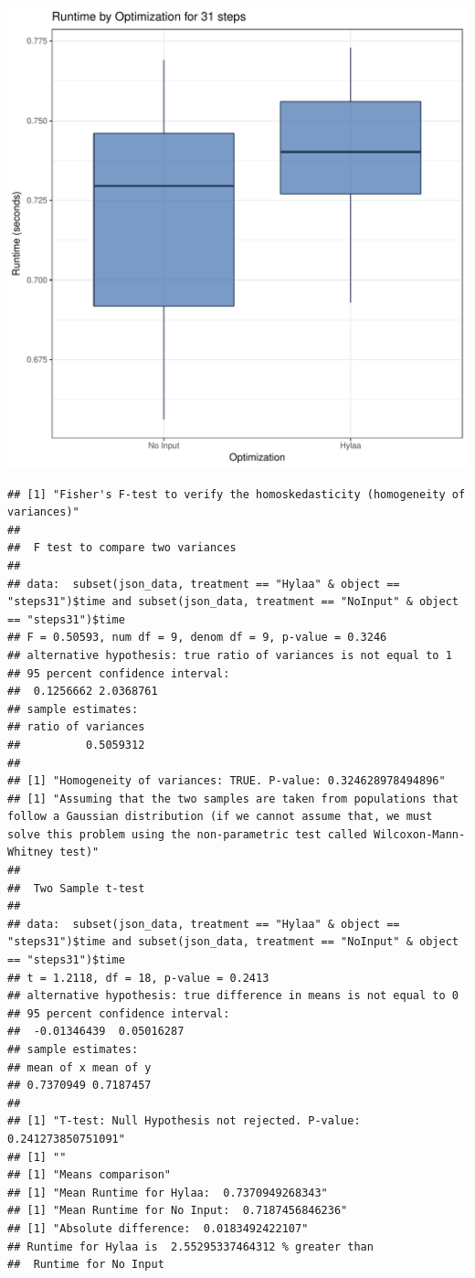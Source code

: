 \documentclass{article}\usepackage[]{graphicx}\usepackage[]{color}
\makeatletter
\def\maxwidth{ %
  \ifdim\Gin@nat@width>\linewidth
    \linewidth
  \else
    \Gin@nat@width
  \fi
}
\newenvironment{kframe}{%
 \def\at@end@of@kframe{}%
 \ifinner\ifhmode%
  \def\at@end@of@kframe{\end{minipage}}%
  \begin{minipage}{\columnwidth}%
 \fi\fi%
 \def\FrameCommand##1{\hskip\@totalleftmargin \hskip-\fboxsep
 \colorbox{shadecolor}{##1}\hskip-\fboxsep
     \hskip-\linewidth \hskip-\@totalleftmargin \hskip\columnwidth}%
 \MakeFramed {\advance\hsize-\width
   \@totalleftmargin\z@ \linewidth\hsize
   \@setminipage}}%
 {\par\unskip\endMakeFramed%
 \at@end@of@kframe}
\newenvironment{knitrout}{}{} %
\makeatother
\begin{document}
\begin{knitrout}
\color{fgcolor}
\includegraphics[width=\maxwidth]{figure/RH4_steps31-1} 
\begin{kframe}\begin{verbatim}
## [1] "Fisher's F-test to verify the homoskedasticity (homogeneity of variances)"
## 
## 	F test to compare two variances
## 
## data:  subset(json_data, treatment == "Hylaa" & object == "steps31")$time and subset(json_data, treatment == "NoInput" & object == "steps31")$time
## F = 0.50593, num df = 9, denom df = 9, p-value = 0.3246
## alternative hypothesis: true ratio of variances is not equal to 1
## 95 percent confidence interval:
##  0.1256662 2.0368761
## sample estimates:
## ratio of variances 
##          0.5059312 
## 
## [1] "Homogeneity of variances: TRUE. P-value: 0.324628978494896"
## [1] "Assuming that the two samples are taken from populations that follow a Gaussian distribution (if we cannot assume that, we must solve this problem using the non-parametric test called Wilcoxon-Mann-Whitney test)"
## 
## 	Two Sample t-test
## 
## data:  subset(json_data, treatment == "Hylaa" & object == "steps31")$time and subset(json_data, treatment == "NoInput" & object == "steps31")$time
## t = 1.2118, df = 18, p-value = 0.2413
## alternative hypothesis: true difference in means is not equal to 0
## 95 percent confidence interval:
##  -0.01346439  0.05016287
## sample estimates:
## mean of x mean of y 
## 0.7370949 0.7187457 
## 
## [1] "T-test: Null Hypothesis not rejected. P-value: 0.241273850751091"
## [1] ""
## [1] "Means comparison"
## [1] "Mean Runtime for Hylaa:  0.7370949268343"
## [1] "Mean Runtime for No Input:  0.7187456846236"
## [1] "Absolute difference:  0.0183492422107"
## Runtime for Hylaa is  2.55295337464312 % greater than 
##  Runtime for No Input
\end{verbatim}
\end{kframe}
\end{knitrout}
\end{document}
